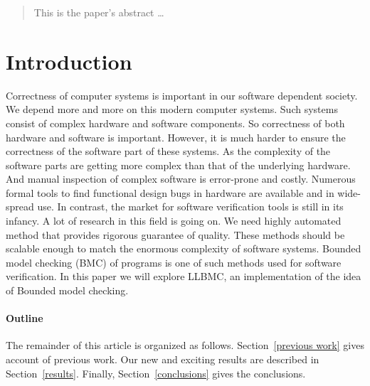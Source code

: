 \documentclass[14pt]{article}
\begin{document}
\maketitle

\begin{abstract}
This is the paper's abstract \ldots
\end{abstract}

\section{Introduction}
Correctness of computer systems is important in our software dependent society. We depend more and more on this modern computer systems. Such systems consist of complex hardware and software components. So correctness of both hardware and software is important. However, it is much harder to ensure the correctness of the software part of these systems. As the complexity of the software parts are getting more complex than that of the underlying hardware.  And manual inspection of complex software is error-prone and costly.  Numerous formal tools to find functional design bugs in hardware are available and in wide-spread use.  In contrast, the market for software verification tools is still in its infancy. A lot of research in this field is going on. We need highly automated method that provides rigorous guarantee of quality. These methods should be scalable enough to match the enormous complexity of software systems. Bounded model checking (BMC) of programs is one of such methods used for software verification. In this paper we will explore LLBMC, an implementation of the idea of  Bounded model checking.

\paragraph{Outline}
The remainder of this article is organized as follows.
Section~\ref{previous work} gives account of previous work.
Our new and exciting results are described in Section~\ref{results}.
Finally, Section~\ref{conclusions} gives the conclusions.
\end{document}
